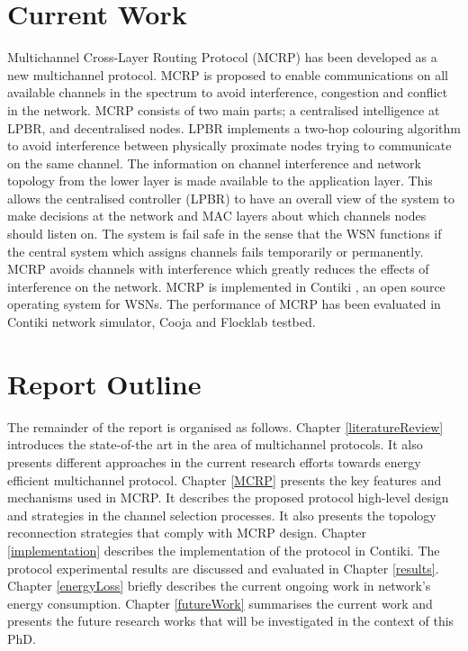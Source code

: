 \section{Current Work}
Multichannel Cross-Layer Routing Protocol (MCRP) has been developed as a new multichannel protocol. MCRP is proposed to enable communications on all available channels in the spectrum to avoid interference, congestion and conflict in the network. MCRP consists of two main parts; a centralised intelligence at LPBR, and decentralised nodes. LPBR implements a two-hop colouring algorithm to avoid interference between physically proximate nodes trying to communicate on the same channel. The information on channel interference and network topology from the lower layer is made available to the application layer. This allows the centralised controller (LPBR) to have an overall view of the system to make decisions at the network and MAC layers about which channels nodes should listen on. The system is fail safe in the sense that the WSN functions if the central system which assigns channels fails temporarily or permanently. MCRP avoids channels with interference which greatly reduces the effects of interference on the network. MCRP is implemented in Contiki \cite{contiki}, an open source operating system for WSNs. The performance of MCRP has been evaluated in Contiki network simulator, Cooja \cite{cooja} and Flocklab \cite{flocklab} testbed.



\section{Report Outline}
The remainder of the report is organised as follows. Chapter \ref{literatureReview} introduces the state-of-the art in the area of multichannel protocols. It also presents different approaches in the current research efforts towards energy efficient multichannel protocol. Chapter \ref{MCRP} presents the key features and mechanisms used in MCRP. It describes the proposed protocol high-level design and strategies in the channel selection processes. It also presents the topology reconnection strategies that comply with MCRP design. Chapter \ref{implementation} describes the implementation of the protocol in Contiki. The protocol experimental results are discussed and evaluated in Chapter \ref{results}. Chapter \ref{energyLoss} briefly describes the current ongoing work in network's energy consumption. Chapter \ref{futureWork} summarises the current work and presents the future research works that will be investigated in the context of this PhD.